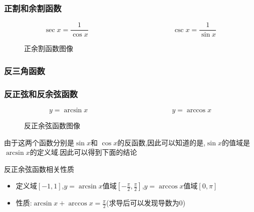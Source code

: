 \documentclass[12pt, a4paper, oneside, UTF8]{ctexbook}  %
\begin{document}
\subsubsection{正割和余割函数}
$$
    \boxed{\sec x=\frac{1}{\cos x}}
    \qquad  \qquad \qquad \qquad \qquad \qquad
    \boxed{\csc x=\frac{1}{\sin x}}
$$
\begin{figure}[H] \centering
    \caption{正余割函数图像}
\end{figure}

\subsubsection{反三角函数}
\subsubsection{反正弦和反余弦函数}
$$
    \boxed{y=\arcsin x}
    \qquad \qquad \qquad \qquad \qquad \qquad
    \boxed{y=\arccos x}
$$
\begin{figure}[H] \centering
    \caption{反正余弦函数图像}
\end{figure}
由于这两个函数分别是$\sin x$和 $\cos x$的反函数,因此可以知道的是,$\sin x$的值域是$\arcsin x$的定义域.因此可以得到下面的结论
\begin{criterion}{反正余弦函数相关性质}{}
    \begin{itemize}
        \item 定义域$[-1,1]$,$y=\arcsin x$值域$[-\frac{\pi}{2},\frac{\pi}{2}]$,$y=\arccos x$值域$[0,\pi]$
        \item 性质:$\arcsin x+\arccos x=\frac{\pi}{2}$(求导后可以发现导数为0)
    \end{itemize}
\end{criterion}
\end{document}
